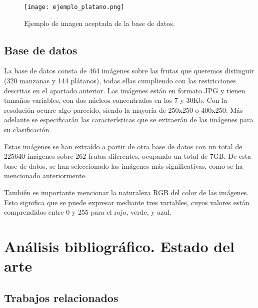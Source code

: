 \documentclass[a4paper, 12pt]{scrarticle}
\begin{document}
    \begin{figure}[!b]
        \centering
        \texttt{[image: ejemplo\_platano.png]}
        \caption{Ejemplo de imagen aceptada de la base de datos.}
        \label{fig:ieplatano}
    \end{figure}

\subsection{Base de datos}

La base de datos consta de 464 imágenes sobre las frutas que queremos distinguir (320 manzanas y 144 plátanos), todas ellas cumpliendo con las restricciones descritas en el apartado anterior. Las imágenes están en formato JPG y tienen tamaños variables, con dos núcleos concentrados en los 7 y 30Kb. Con la resolución ocurre algo parecido, siendo la mayoría de 250x250 o 400x250. Más adelante se especificarán las características que se extraerán de las imágenes para su clasificación. \\ \par

Estas imágenes se han extraído a partir de otra base de datos \cite{BD} con un total de 225640 imágenes sobre 262 frutas diferentes, ocupando un total de 7GB. De esta base de datos, se han seleccionado las imágenes más significativas, como se ha mencionado anteriormente. \\ \par

También es importante mencionar la naturaleza RGB del color de las imágenes. Esto significa que se puede expresar mediante tres variables, cuyos valores están comprendidos entre 0 y 255 para el rojo, verde, y azul. \\ \par



\section{Análisis bibliográfico. Estado del arte}
\subsection{Trabajos relacionados}

\end{document}
